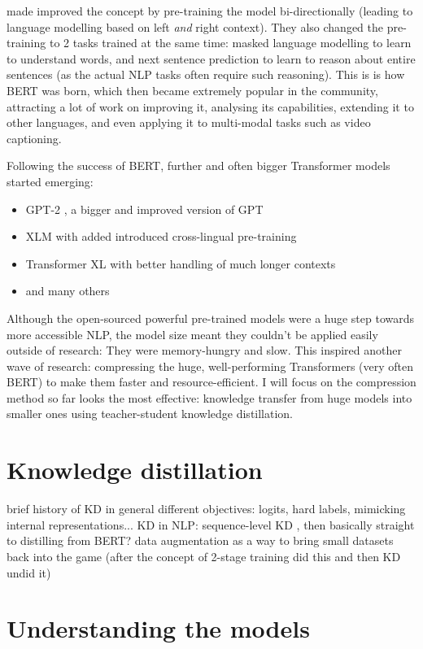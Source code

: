 \documentclass[bsc,frontabs,twoside,singlespacing,parskip,deptreport]{infthesis}
\begin{document}
{{    \citet{Devlin_2018} made improved the concept by pre-training the model bi-directionally (leading to language modelling based on left \textit{and} right context). They also changed the pre-training to 2 tasks trained at the same time: masked language modelling to learn to understand words, and next sentence prediction to learn to reason about entire sentences (as the actual NLP tasks often require such reasoning). This is is how BERT was born, which then became extremely popular in the community, attracting a lot of work on improving it, analysing its capabilities, extending it to other languages, and even applying it to multi-modal tasks such as video captioning.
    
    Following the success of BERT, further and often bigger Transformer models started emerging:
    \begin{itemize}
      \item GPT-2 \citep{Radford_2019}, a bigger and improved version of GPT
      \item XLM \citep{Lample_2019} with added introduced cross-lingual pre-training
      \item Transformer XL \citep{Dai_2019} with better handling of much longer contexts
      \item and many others
    \end{itemize}

    Although the open-sourced powerful pre-trained models were a huge step towards more accessible NLP, the model size meant they couldn't be applied easily outside of research: They were memory-hungry and slow. This inspired another wave of research: compressing the huge, well-performing Transformers (very often BERT) to make them faster and resource-efficient. I will focus on the compression method so far looks the most effective: knowledge transfer from huge models into smaller ones using teacher-student knowledge distillation.
  }

  \section{Knowledge distillation}{
    brief history of KD in general
    different objectives: logits, hard labels, mimicking internal representations...
    KD in NLP: sequence-level KD \citep{Kim_2016}, then basically straight to distilling from BERT?
    data augmentation as a way to bring small datasets back into the game (after the concept of 2-stage training did this and then KD undid it)
  }
  
  \section{Understanding the models}{

  }
}
\end{document}
